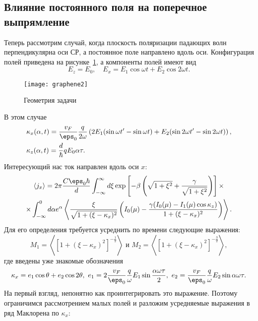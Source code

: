 \subsection{Влияние постоянного поля на поперечное выпрямление}
Теперь рассмотрим случай, когда плоскость поляризации падающих волн перпендикулярна оси СР, а постоянное поле направлено вдоль оси. Конфигурация полей приведена на рисунке~\ref{fig:geometry2}, а компоненты полей имеют вид
\begin{equation*}
  E_z = E_0,\quad E_x = E_1\cos\omega t + E_2\cos2\omega t.
\end{equation*}
\begin{figure}[!h]
    \center
    \texttt{[image: graphene2]}
    \caption{Геометрия задачи}
    \label{fig:geometry2}
\end{figure}
В этом случае
\begin{align*}
    &\kappa_x(\alpha, t) =
    \frac{v_F}{\eps_0}\frac{q}{2\omega}\left(2E_1(\sin\omega t' - \sin\omega t)
    + E_2(\sin2\omega t' - \sin2\omega t)\right),\\
    &\kappa_z(\alpha, t) = \frac{d}{\hbar}qE_0\alpha\tau.
\end{align*}
Интересующий нас ток направлен вдоль оси \(x\):
\begin{gather*}
  \langle j_x \rangle = 2\pi \frac{C\eps_0\hbar}{d} \int_{-\infty}^\infty d\xi
    \exp\left[-\beta\left(\sqrt{1+\xi^2}+\frac{\gamma}{\sqrt{1+\xi^2}}\right)\right]
    \times\\\times\int_{-\infty}^{0}
    d \alpha e^\alpha\left\langle\frac{\xi}{\sqrt{1 + (\xi-\kappa_x)^2}}\left(
    I_0(\mu) - \frac{\gamma(I_0(\mu)-I_1(\mu)\cos\kappa_z)}{1 +
(\xi-\kappa_x)^2}\right)\right\rangle.
\end{gather*}
Для его определения требуется усреднить по времени следующие выражения:
\begin{equation*}
    M_1 = \left\langle\left[1 +
    (\xi-\kappa_x)^2\right]^{-\frac{1}{2}}\right\rangle \text{ и }
    M_2 = \left\langle\left[1 +
    (\xi-\kappa_x)^2\right]^{-\frac{3}{2}}\right\rangle,
\end{equation*}
где введены уже знакомые обозначения
\begin{equation*}
    \kappa_x = e_1\cos\theta + e_2\cos2\theta,\ e_1 =
    2\frac{v_F}{\eps_0}\frac{q}{\omega}E_1 \sin\frac{\alpha\omega\tau}{2},
    \ e_2 = \frac{v_F}{\eps_0}\frac{q}{\omega}E_2 \sin\alpha\omega\tau.
\end{equation*}
На первый взгляд, непонятно как проинтегрировать это выражение. Поэтому ограничимся рассмотрением малых полей и разложим усредняемые выражения в ряд Маклорена по \( \kappa_x \):
